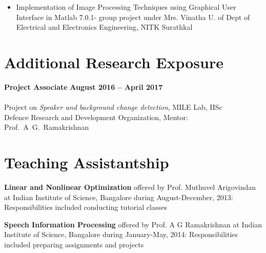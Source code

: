 \documentclass[line]{resume}
\begin{document}
{\begin{resume}
\begin{itemize}



\item
Implementation of Image Processing Techniques using Graphical User
Interface in Matlab 7.0.1- group project under Mrs. Vinatha U. of Dept of Electrical
and Electronics Engineering, NITK Surathkal





\end{itemize}		
			
			\section{\mysidestyle Additional Research Exposure}
			\vspace{1mm}
		
			
			\textbf{Project Associate} \hfill \textbf{ August 2016 -- April 2017}\vspace{-3mm}\\\vspace{-1mm}\\%
			 Project on \textit{Speaker and background change detection}, MILE Lab, IISc\\ Defence Research and Development Organization,
			Mentor: Prof.~A~G.~Ramakrishnan\vspace{-6mm}\\
			
		
			\vspace{-1.5mm}
			\section{\mysidestyle Teaching Assistantship}
			\vspace{1mm}
		

		\textbf{Linear and Nonlinear Optimization} offered  by Prof. Muthuvel Arigovindan at  Indian Institute of Science, Bangalore during 
		August-December, 2013: Responsibilities included conducting tutorial classes  
		\vspace{-3mm}
		
		\textbf{Speech Information Processing}  offered  by Prof. A G Ramakrishnan at  Indian Institute of Science, Bangalore during 
		January-May, 2014: Responsibilities included   preparing assignments and projects
				\vspace{-3mm}
		

\end{resume}}
\end{document}

